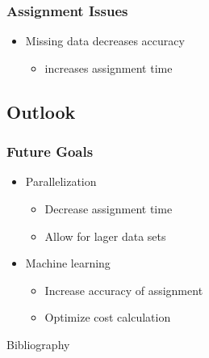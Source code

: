 \documentclass{beamer}
\begin{document}
\begin{frame}
	\frametitle{Assignment Issues}
	\begin{itemize}
		\item Missing data decreases accuracy
		\begin{itemize}
			\item increases assignment time
		\end{itemize}
	\end{itemize}
\end{frame}



\subsection{Outlook}
\begin{frame}
	\frametitle{Future Goals}
	\begin{itemize}
		\item Parallelization
		\begin{itemize}
			\item Decrease assignment time
			\item Allow for lager data sets
		\end{itemize}
		\item Machine learning
		\begin{itemize}
			\item Increase accuracy of assignment
			\item Optimize cost calculation
		\end{itemize}
	\end{itemize}
\end{frame}


\begin{frame}{Bibliography}


\end{frame}
\end{document}
